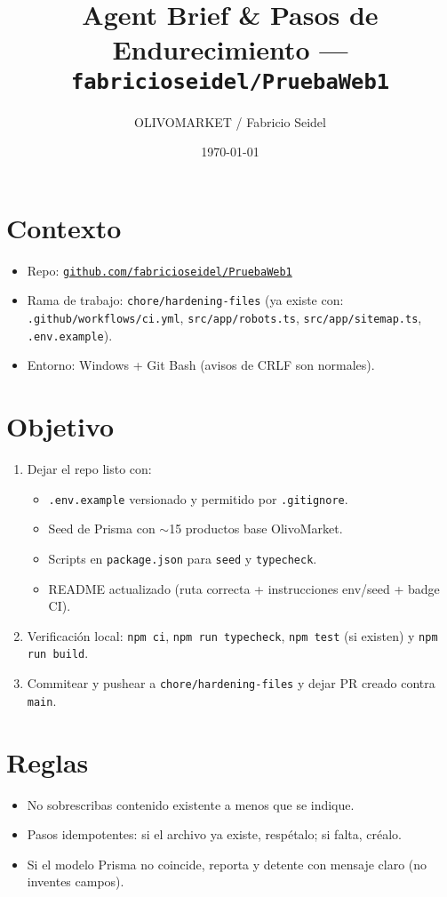 \documentclass[11pt]{article}
\title{Agent Brief \& Pasos de Endurecimiento — \texttt{fabricioseidel/PruebaWeb1}}
\author{OLIVOMARKET / Fabricio Seidel}
\date{\today}
\begin{document}
\maketitle

\section*{Contexto}
\begin{itemize}[leftmargin=*]
  \item Repo: \href{https://github.com/fabricioseidel/PruebaWeb1}{\texttt{github.com/fabricioseidel/PruebaWeb1}}
  \item Rama de trabajo: \texttt{chore/hardening-files} (ya existe con: \texttt{.github/workflows/ci.yml}, \texttt{src/app/robots.ts}, \texttt{src/app/sitemap.ts}, \texttt{.env.example}).
  \item Entorno: Windows + Git Bash (avisos de CRLF son normales).
\end{itemize}

\section*{Objetivo}
\begin{enumerate}[label=\arabic*., leftmargin=*]
  \item Dejar el repo listo con:
  \begin{itemize}
    \item \texttt{.env.example} versionado y permitido por \texttt{.gitignore}.
    \item Seed de Prisma con \(\sim\)15 productos base OlivoMarket.
    \item Scripts en \texttt{package.json} para \texttt{seed} y \texttt{typecheck}.
    \item README actualizado (ruta correcta + instrucciones env/seed + badge CI).
  \end{itemize}
  \item Verificación local: \texttt{npm ci}, \texttt{npm run typecheck}, \texttt{npm test} (si existen) y \texttt{npm run build}.
  \item Commitear y pushear a \texttt{chore/hardening-files} y dejar PR creado contra \texttt{main}.
\end{enumerate}

\section*{Reglas}
\begin{itemize}[leftmargin=*]
  \item No sobrescribas contenido existente a menos que se indique.
  \item Pasos idempotentes: si el archivo ya existe, respétalo; si falta, créalo.
  \item Si el modelo Prisma no coincide, reporta y detente con mensaje claro (no inventes campos).
\end{itemize}
\end{document}
